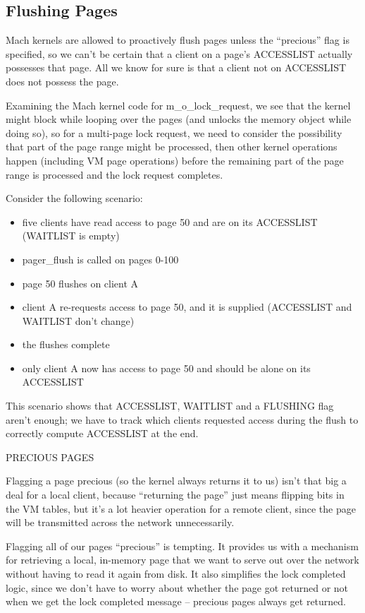 \documentclass{article}
\begin{document}
\subsection{Flushing Pages}

Mach kernels are allowed to proactively flush pages unless the
``precious'' flag is specified, so we can't be certain that a client
on a page's ACCESSLIST actually possesses that page.  All we know for
sure is that a client not on ACCESSLIST does not possess the page.

Examining the Mach kernel code for m_o_lock_request, we see that the kernel might block
while looping over the pages (and unlocks the memory object while doing so), so for a
multi-page lock request, we need to consider the possibility that part of the page range
might be processed, then other kernel operations happen (including VM page operations)
before the remaining part of the page range is processed and the lock request completes.

Consider the following scenario:

\begin{itemize}
\item five clients have read access to page 50 and are on its ACCESSLIST (WAITLIST is empty)
\item pager_flush is called on pages 0-100
\item page 50 flushes on client A
\item client A re-requests access to page 50, and it is supplied (ACCESSLIST and WAITLIST don't change)
\item the flushes complete
\item only client A now has access to page 50 and should be alone on its ACCESSLIST
\end{itemize}

This scenario shows that ACCESSLIST, WAITLIST and a FLUSHING flag
aren't enough; we have to track which clients requested access during
the flush to correctly compute ACCESSLIST at the end.


PRECIOUS PAGES

Flagging a page precious (so the kernel always returns it to us) isn't that big a deal
for a local client, because ``returning the page'' just means flipping bits in the VM tables,
but it's a lot heavier operation for a remote client, since the page will be transmitted
across the network unnecessarily.

Flagging all of our pages ``precious'' is tempting.  It provides us with a mechanism
for retrieving a local, in-memory page that we want to serve out over the network
without having to read it again from disk.  It also simplifies the lock completed
logic, since we don't have to worry about whether the page got returned or not
when we get the lock completed message -- precious pages always get returned.
\end{document}
